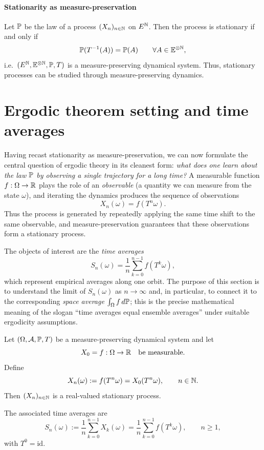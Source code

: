 \paragraph{Stationarity as measure-preservation}
Let \(\mathbb{P}\) be the law of a process \((X_n)_{n\in\mathbb{N}}\) on \(E^{\mathbb{N}}\). Then the process is stationary if and only if
\[
\mathbb{P}(T^{-1}(A))=\mathbb{P}(A)\qquad\forall A\in \mathbb{E}^{\otimes \mathbb{N}},
\]
i.e.\ \((E^{\mathbb{N}},\mathbb{E}^{\otimes \mathbb{N}},\mathbb{P},T)\) is a measure-preserving dynamical system.
Thus, stationary processes can be studied through measure-preserving dynamics.

\section{Ergodic theorem setting and time averages}

Having recast stationarity as measure-preservation, we can now formulate the central question of ergodic theory in its
cleanest form: \emph{what does one learn about the law $\mathbb{P}$ by observing a single trajectory for a long time?}
A measurable function $f:\Omega\to\mathbb{R}$ plays the role of an \emph{observable} (a quantity we can measure from the state
$\omega$), and iterating the dynamics produces the sequence of observations
\[
X_n(\omega)=f(T^n\omega).
\]
Thus the process is generated by repeatedly applying the same time shift to the same observable, and measure-preservation
guarantees that these observations form a stationary process.

\medskip
The objects of interest are the \emph{time averages}
\[
S_n(\omega)=\frac1n\sum_{k=0}^{n-1} f(T^k\omega),
\]
which represent empirical averages along one orbit.
The purpose of this section is to understand the limit of $S_n(\omega)$ as $n\to\infty$ and, in particular, to connect it
to the corresponding \emph{space average} $\int_\Omega f\,d\mathbb{P}$; this is the precise mathematical meaning of the slogan
``time averages equal ensemble averages'' under suitable ergodicity assumptions.


Let \((\Omega,\mathcal{A},\mathbb{P},T)\) be a measure-preserving dynamical system and let
\[
X_0=f:\Omega\to\mathbb{R}
\quad\text{be measurable}.
\]
Define
\[
X_n(\omega) := f(T^n\omega) = X_0(T^n\omega),
\qquad n\in\mathbb{N}.
\]
Then \((X_n)_{n\in\mathbb{N}}\) is a real-valued stationary process.

The associated time averages are
\[
S_n(\omega)
:= \frac1n\sum_{k=0}^{n-1}X_k(\omega)
= \frac1n\sum_{k=0}^{n-1} f(T^k\omega),
\qquad n\ge 1,
\]
with \(T^0=\textrm{id}\).

